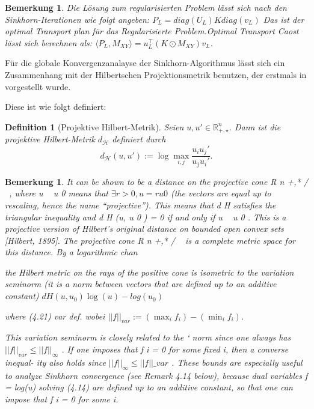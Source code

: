 \documentclass[11pt,a4paper]{article}
\newtheorem{definition}[theorem]{Definition}
\newtheorem{remark}[theorem]{Bemerkung}
\numberwithin{equation}{section}
\begin{document}
		
		
	\begin{remark}
	Die Lösung zum regularisierten Problem lässt sich nach den Sinkhorn-Iterationen wie folgt angeben: $P_L = diag(U_L)K diag(v_L)$ Das ist  der optimal Transport plan für das Regularisierte Problem.Optimal Transport Caost lässt sich berechnen als:
$\langle P_L, M_{XY}\rangle = u_L ^\top ( K \odot M_{XY})v_L$.	\end{remark}	
	
	
		Für die globale Konvergenzanalayse der Sinkhorn-Algorithmus lässt sich ein Zusammenhang mit der Hilbertschen Projektionsmetrik benutzen, der erstmals in \cite{franklin_sinkhorn_convergence} vorgestellt wurde.
		
		Diese ist wie folgt definiert:
		
		\begin{definition}[Projektive Hilbert-Metrik]
			Seien $u,u' \in \mathbb{R}_{+,\star}^n$.
			Dann ist die projektive Hilbert-Metrik $d_\mathcal{H}$ definiert durch
			\begin{equation}
				d_\mathcal{H}(u,u') := \log \max_{i,j}{\frac{u_iu_j'}{u_ju_i'}}.
			\end{equation}
		\end{definition}
		
		\begin{remark}
			It can be shown to be a distance on the projective cone R n +,* / ~, where u ~ u 0
			means that $\exists r > 0, u = ru 0$ (the vectors are equal up to rescaling, hence the
			name “projective”). This means that d H satisfies the triangular inequality and
			d H (u, u 0 ) = 0 if and only if u ~ u 0 . This is a projective version of Hilbert’s original
			distance on bounded open convex sets [Hilbert, 1895]. The projective cone R n +,* / ~
			is a complete metric space for this distance. By a logarithmic chan
			
			the Hilbert metric on the rays of the positive cone is isometric to the variation
			seminorm (it is a norm between vectors that are defined up to an additive constant)
			$dH(u,u_0) \log (u) -log(u_0)$
			
			where
			(4.21)
			var
			def.
			wobei $||f||_{var} := (\max_i f_i) -(\min_i f_i)$.
		
			This variation seminorm is closely related to the ` norm since one always has
			$||f||_{var} \leq ||f||_{\infty}$  . If one imposes that f i = 0 for some fixed i, then a converse inequal-
			ity also holds since $||f||_{\infty} \leq ||f||\_{var}$ . These bounds are especially useful to analyze
			Sinkhorn convergence (see Remark 4.14 below), because dual variables f = log(u)
			solving (4.14) are defined up to an additive constant, so that one can impose that
			f i = 0 for some i. 
		\end{remark}
		
\end{document}
